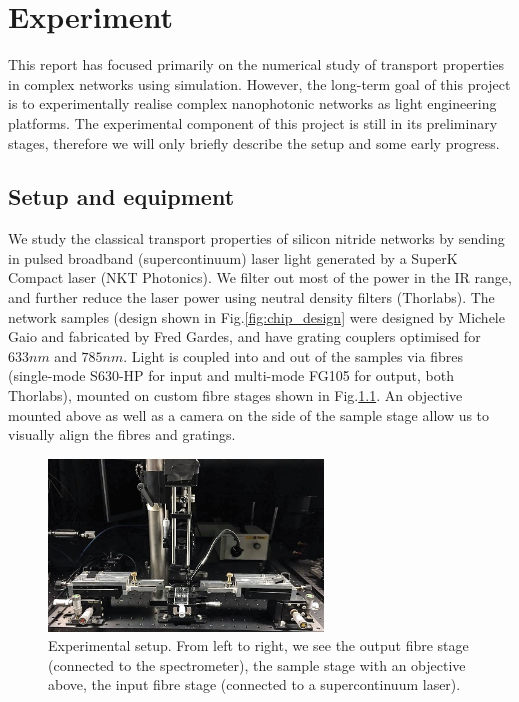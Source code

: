 \chapter{Experiment}

This report has focused primarily on the numerical study of transport properties in complex networks using simulation. However, the long-term goal of this project is to experimentally realise complex nanophotonic networks as light engineering platforms. The experimental component of this project is still in its preliminary stages, therefore we will only briefly describe the setup and some early progress.

\section{Setup and equipment}

We study the classical transport properties of silicon nitride networks by sending in pulsed broadband (supercontinuum) laser light generated by a SuperK Compact laser (NKT Photonics). We filter out most of the power in the IR range, and further reduce the laser power using neutral density filters (Thorlabs). The network samples (design shown in Fig.\ref{fig:chip_design} were designed by Michele Gaio and fabricated by Fred Gardes, and have grating couplers optimised for $633nm$ and $785nm$. Light is coupled into and out of the samples via fibres (single-mode S630-HP for input and multi-mode FG105 for output, both Thorlabs), mounted on custom fibre stages shown in Fig.\ref{fig:exp_setup}. An objective mounted above as well as a camera on the side of the sample stage allow us to visually align the fibres and gratings.
\begin{figure}[htp]
  \centering
    \includegraphics[width=0.65\textwidth]{ch4/fig4/exp_setup.jpg}
    \caption{Experimental setup. From left to right, we see the output fibre stage (connected to the spectrometer), the sample stage with an objective above, the input fibre stage (connected to a supercontinuum laser).} 
    \label{fig:exp_setup}
\end{figure}

